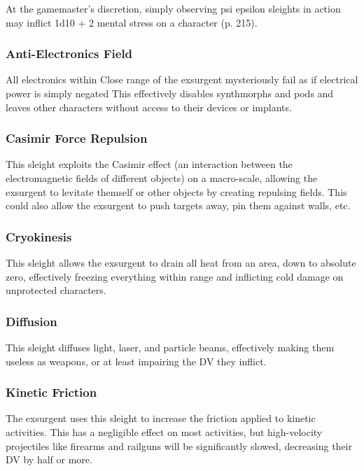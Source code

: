 At the gamemaster's discretion, simply observing psi epsilon sleights in action may inflict 1d10 + 2 mental stress on a character (p. 215). 

\subsubsection{Anti-Electronics Field} 

All electronics within Close range of the exsurgent mysteriously fail as if electrical power is simply negated This effectively disables synthmorphs and pods and leaves other characters without access to their devices or implants. 

\subsubsection{Casimir Force Repulsion} 

This sleight exploits the Casimir effect (an interaction between the electromagnetic fields of different objects) on a macro-scale, allowing the exsurgent to levitate themself or other objects by creating repulsing fields. This could also allow the exsurgent to push targets away, pin them against walls, etc. 

\subsubsection{Cryokinesis} 

This sleight allows the exsurgent to drain all heat from an area, down to absolute zero, effectively freezing everything within range and inflicting cold damage on unprotected characters. 

\subsubsection{Diffusion} 

This sleight diffuses light, laser, and particle beams, effectively making them useless as weapons, or at least impairing the DV they inflict. 

\subsubsection{Kinetic Friction} 

The exsurgent uses this sleight to increase the friction applied to kinetic activities. This has a negligible effect on most activities, but high-velocity projectiles like firearms and railguns will be significantly slowed, decreasing their DV by half or more. 


